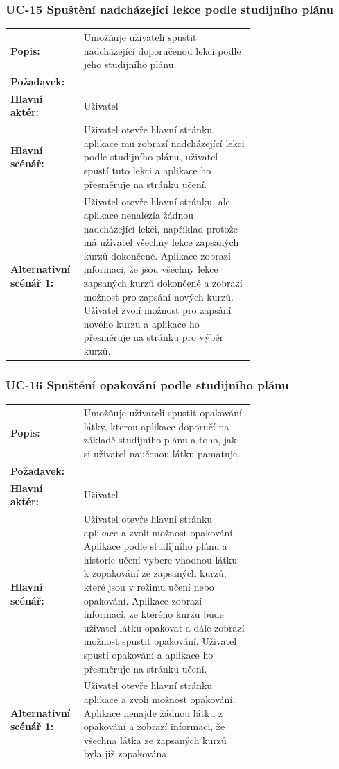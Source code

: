 \subsubsection{UC-15 Spuštění nadcházející lekce podle studijního plánu}

\begin{tabular}{lp{0.7\linewidth}}
  \textbf{Popis:} & Umožňuje uživateli spustit nadcházející doporučenou lekci podle jeho studijního plánu. \\
  \textbf{Požadavek:} & \nameref{sec:fp-study-plan-learning} \\
  \textbf{Hlavní aktér:} & Uživatel \\
  \textbf{Hlavní scénář:} & Uživatel otevře hlavní stránku, aplikace mu zobrazí nadcházející lekci podle studijního plánu, uživatel spustí tuto lekci a aplikace ho přesměruje na stránku učení. \\
  \textbf{Alternativní scénář 1:} & Uživatel otevře hlavní stránku, ale aplikace nenalezla žádnou nadcházející lekci, například protože má uživatel všechny lekce zapsaných kurzů dokončené. Aplikace zobrazí informaci, že jsou všechny lekce zapsaných kurzů dokončené a zobrazí možnost pro zapsání nových kurzů. Uživatel zvolí možnost pro zapsání nového kurzu a aplikace ho přesměruje na stránku pro výběr kurzů. \\
\end{tabular}

\subsubsection{UC-16 Spuštění opakování podle studijního plánu}

\begin{tabular}{lp{0.7\linewidth}}
  \textbf{Popis:} & Umožňuje uživateli spustit opakování látky, kterou aplikace doporučí na základě studijního plánu a toho, jak si uživatel naučenou látku pamatuje. \\
  \textbf{Požadavek:} & \nameref{sec:fp-study-plan-learning} \\
  \textbf{Hlavní aktér:} & Uživatel \\
  \textbf{Hlavní scénář:} & Uživatel otevře hlavní stránku aplikace a zvolí možnost opakování. Aplikace podle studijního plánu a historie učení vybere vhodnou látku k zopakování ze zapsaných kurzů, které jsou v režimu učení nebo opakování. Aplikace zobrazí informaci, ze kterého kurzu bude uživatel látku opakovat a dále zobrazí možnost spustit opakování. Uživatel spustí opakování a aplikace ho přesměruje na stránku učení. \\
  \textbf{Alternativní scénář 1:} & Uživatel otevře hlavní stránku aplikace a zvolí možnost opakování. Aplikace nenajde žádnou látku z opakování a zobrazí informaci, že všechna látka ze zapsaných kurzů byla již zopakována. \\
\end{tabular}

